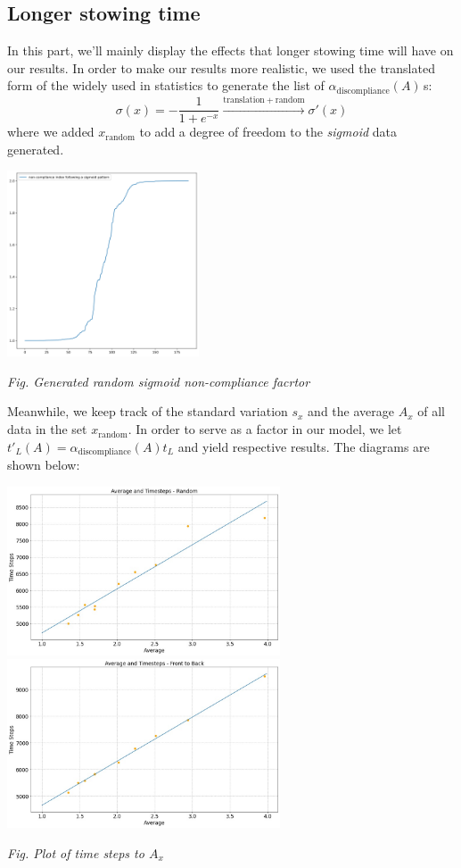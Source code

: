 \documentclass{article}
\theoremstyle{definition}
\theoremstyle{remark}
\numberwithin{equation}{section}
\begin{document}
	\subsection{Longer stowing time}
	In this part, we'll mainly display the effects that longer stowing time will have on our results. In order to make our results more realistic, we used the translated form of the  widely used in statistics to generate the list of $\alpha_\text{discompliance}(A)\,$s:
	\[\sigma \left( x \right) =-\frac{1}{1+e^{-x}}\xrightarrow{\mathrm{translation}+\mathrm{random}}\sigma '\left( x \right)  \]
	where we added \(x_{\mathrm{random}}\) to add a degree of freedom to the \textit{sigmoid} data generated.
	\begin{center}
		\includegraphics[height = 5.5cm]{sigmoid non compliance.png}

		\small\textit{Fig. Generated random sigmoid non-compliance facrtor}
	\end{center}
	Meanwhile, we keep track of the standard variation \(s_x\) and the average \(A_x\) of all data in the set \(x_{\mathrm{random}}\). In order to serve as a  factor in our model, we let \(t'_L(A) = \alpha_\text{discompliance}(A)t_L\) and yield respective results. The diagrams are shown below:

	\begin{center}
		\includegraphics[height = 5cm]{avetimesteps random fitted.jpg}
		\includegraphics[height = 5cm]{avetimesteps ftb fitted.jpg}

		\small\textit{Fig. Plot of time steps to \(A_x\)}
	\end{center}
\end{document}
